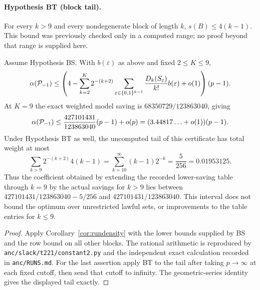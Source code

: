 \paragraph{Hypothesis BT (block tail).}\label{hyp:tail}
For every $k>9$ and every nondegenerate block of length $k$, $s(B)\le4(k-1)$.
This bound was previously checked only in a computed range; no proof beyond that range is supplied here.

\begin{corollary}\label{cor:blockconst}
Assume Hypothesis BS.  With $b(\varepsilon)$ as above and fixed $2\le K\le9$,
\[
 \alpha(\mathcal{P}_{-1})\le\left(4-\sum_{k=2}^K2^{-(k+2)}
 \sum_{\varepsilon\in\{0,1\}^{k-1}}\frac{D_k(S_\varepsilon)}{k!}b(\varepsilon)+o(1)\right)(p-1).
\]
At $K=9$ the exact weighted model saving is $68350729/123863040$, giving
\[
 \alpha(\mathcal{P}_{-1})\le\frac{427101431}{123863040}(p-1)+o(p)
       =(3.44817\ldots+o(1))(p-1).
\]
Under Hypothesis BT as well, the uncomputed tail of this certificate has total weight at most
\[
 \sum_{k>9}2^{-(k+2)}4(k-1)=\sum_{k=10}^\infty(k-1)2^{-k}
 =\frac5{256}=0.01953125.
\]
Thus the coefficient obtained by extending the recorded lower-saving table through $k=9$ by the actual savings for $k>9$ lies between
$427101431/123863040-5/256$ and $427101431/123863040$.
This interval does not bound the optimum over unrestricted lawful sets, or improvements to the table entries for $k\le9$.
\end{corollary}
\begin{proof}
Apply Corollary~\ref{cor:rundensity} with the lower bounds supplied by BS and the row bound on all other blocks.
The rational arithmetic is reproduced by \texttt{anc/slack/t221/constant2.py} and the independent exact calculation recorded in \texttt{anc/RUNS.md}.
For the last assertion apply BT to the tail after taking $p\to\infty$ at each fixed cutoff, then send that cutoff to infinity.
The geometric-series identity gives the displayed tail exactly.
\end{proof}

